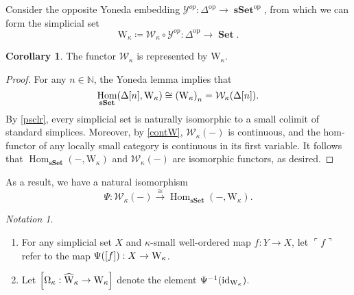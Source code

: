 \documentclass[10pt,letterpaper,cm]{nupset}
\theoremstyle{definition}
\theoremstyle{theorem}
\newtheorem{corollary}[definition]{Corollary}
\theoremstyle{remark}
\newtheorem*{notation}{Notation}
\newcommand{\0}{\mathbf{0}}
\newcommand{\1}{\mathbf{1}}
\newcommand{\2}{\mathbf{2}}
\DeclareMathOperator{\op}{op}
\DeclareMathOperator{\sset}{\mathbf{sSet}}
\DeclareMathOperator{\set}{\mathbf{Set}}
\newcommand{\N}{\mathbb N}
\DeclareMathOperator{\Hom}{Hom}
\DeclareMathOperator{\idd}{id}
\newcommand{\be}{\begin{enumerate}}
\newcommand{\ee}{\end{enumerate}}
\begin{document}
\smallskip

Consider the opposite Yoneda embedding $\mathcal{Y}^{op} : \varDelta^{\op}  \to \sset^{\op}$, from which we can form the simplicial set
\[
\mathrm{W}_{\kappa} \coloneqq \mathcal{W}_{\kappa} \circ \mathcal{Y}^{op} : \varDelta^{\op} \to \set.
\]

\begin{corollary}
The functor $\mathcal{W}_{\kappa}$ is represented by $\mathrm{W}_{\kappa}$.
\end{corollary}
\begin{proof}
For any $n\in \N$, the Yoneda lemma implies that $$\Hom_{\sset}\mleft(\Delta[n], \mathrm{W}_{\kappa}\mright) \cong \mleft(\mathrm{W}_{\kappa}\mright)_n = \mathcal{W}_{\kappa}\mleft(\Delta[n]\mright).$$
By \cref{psclr}, every simplicial set is naturally isomorphic to a small colimit of standard simplices.  Moreover, by \cref{contW}, $ \mathcal{W}_{\kappa}({-})$ is continuous, and the hom-functor of any locally small category is continuous in its first variable. It follows that $\Hom_{\sset}({-}, \mathrm{W}_{\kappa})$ and $ \mathcal{W}_{\kappa}({-})$ are isomorphic functors, as desired. 
\end{proof}

As a result,  we have a natural isomorphism
\[\label{bigiso}
\Psi : \mathcal{W}_{\kappa}({-})     \overset{\cong}{\longrightarrow} \Hom_{\sset}({-}, \mathrm{W}_{\kappa}).
\tag{$\Psi$}
\]

\begin{notation} $ $
\be
\item For any simplicial set $X$ and $\kappa$-small well-ordered map  $f : Y \to X$, let $\ulcorner{f}\urcorner$ refer to the map $\Psi(\mleft[f\mright]): X \to  \mathrm{W}_{\kappa}$.
\item Let $\mleft[\Omega_{\kappa} : \widehat{\mathrm{W}}_{\kappa} \to  \mathrm{W}_{\kappa} \mright]$ denote the element $\Psi^{-1}\mleft(\idd_{\mathrm{W}_{\kappa}}\mright)$.
\ee
\end{notation}
\end{document}
